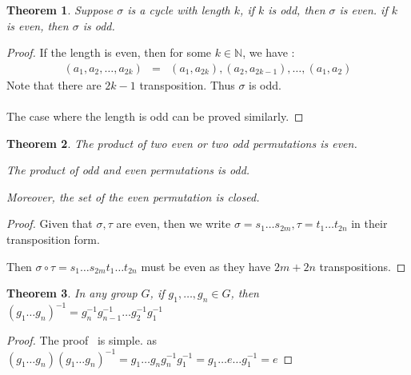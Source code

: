 \documentclass{article}
\theoremstyle{MyNonumberplain}
\theoremstyle{break}
\newtheorem*{proof}{Proof. }
\theoremstyle{break}
\newtheorem{theorem}{Theorem}[section]
\theoremstyle{break}
\theoremstyle{definition}
\theoremstyle{break}
\begin{document}
\begin{thmbox}
    \begin{theorem}
        Suppose $\sigma$ is a cycle with length $k$, if $k$ is odd, then $\sigma$ is even. if $k$ is even, then $\sigma$ is odd.
    \end{theorem}
    \begin{prfbox}
        \begin{proof}
            If the length is even, then for some $k \in \mathbb{N}$, we have :
            \begin{eqnarray*}
                (a_1, a_2, \ldots, a_{2 k}) & = & (a_1, a_{2 k}), (a_2, a_{2 k - 1}),
                \ldots, (a_1, a_2)
            \end{eqnarray*}
            Note that there are $2 k - 1$ transposition. Thus $\sigma$ is odd. \\\\
            The case where the length is odd can be proved similarly.
        \end{proof}
    \end{prfbox}
\end{thmbox}

\begin{thmbox}
    \begin{theorem}
        The product of two even or two odd permutations is even.\bigskip

        The product of odd and even permutations is odd.\bigskip

        Moreover, the set of the even permutation is closed.
    \end{theorem}
    \begin{prfbox}
        \begin{proof}
            Given that $\sigma, \tau$ are even, then we write $\sigma = s_1 \ldots s_{2
            m}, \tau = t_1 \ldots t_{2 n}$ in their transposition form.\bigskip

            Then $\sigma \circ \tau = s_1 \ldots s_{2 m} t_1 \ldots t_{2 n}$ must be even
            as they have $2 m + 2 n$ transpositions.
        \end{proof}
    \end{prfbox}
\end{thmbox}

\begin{thmbox}
    \begin{theorem}
        In any group $G$, if $g_1, \ldots, g_n \in G$, then $(g_1 \ldots g_n)^{- 1} = g^{- 1}_n g^{- 1}_{n - 1} \ldots g^{- 1}_2 g^{- 1}_1$
    \end{theorem}
    \begin{prfbox}
        \begin{proof}
            The proof \ is simple. as $(g_1 \ldots g_n) (g_1 \ldots g_n)^{- 1} = g_1 \ldots g_n g^{- 1}_n g^{- 1}_1 = g_1 \ldots e \ldots g^{- 1}_1 = e$
        \end{proof}
    \end{prfbox}
\end{thmbox}
\end{document}
